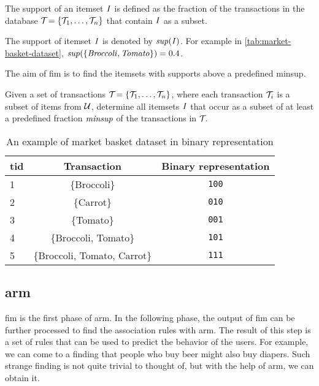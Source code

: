 \begin{definition}
    The support of an itemset $\mathit{I}$ is defined as the fraction of the transactions in the database $\mathcal{T}_{} = \{\mathcal{T}_{1}, \dots, \mathcal{T}_{n}\}{}$ that contain $\mathit{I}$ as a subset.
\end{definition}
\begin{sloppypar}
    The support of itemset $\mathit{I}$ is denoted by $\mathit{sup({I})}$.
    For example in \autoref{tab:market-basket-dataset}, $\mathit{sup({\{Broccoli, Tomato\}})} = 0.4$.
\end{sloppypar}
The aim of \acl{fim} is to find the itemsets with supports above a predefined \ac{minsup}.

\begin{definition}
    Given a set of transactions $\mathcal{T}_{} = \{\mathcal{T}_{1}, \dots, \mathcal{T}_{n}\}{}$, where each transaction $\mathcal{T}_{i}$ is a subset of items from $\mathcal{U}$, determine all itemsets $\mathit{I}$ that occur as a subset of at least a predefined fraction $\mathit{minsup}$ of the transactions in $\mathcal{T}_{}$.
\end{definition}

\begin{table}[tb]
    \centering
    \begin{tabular}{|l|c|c|}
        \hline
        \textbf{\ac{tid}} & \textbf{Transaction}         & \textbf{Binary representation} \\ \hline
        1            & \{Broccoli\}                 & \texttt{100}                   \\ \hline
        2            & \{Carrot\}                   & \texttt{010}                   \\ \hline
        3            & \{Tomato\}                   & \texttt{001}                   \\ \hline
        4            & \{Broccoli, Tomato\}         & \texttt{101}                   \\ \hline
        5            & \{Broccoli, Tomato, Carrot\} & \texttt{111}                   \\ \hline
    \end{tabular}
    \caption{An example of market basket dataset in binary representation}
    \label{tab:market-basket-dataset}
\end{table}
\subsection{\Acl{arm}}
\label{sub:association_rule_mining}
\Ac{fim} is the first phase of \ac{arm}.
In the following phase, the output of \ac{fim} can be further processed to find the association rules with \acl{arm}.
The result of this step is a set of rules that can be used to predict the behavior of the users.
For example, we can come to a finding that people who buy beer might also buy diapers.
Such strange finding is not quite trivial to thought of, but with the help of \acl{arm}, we can obtain it.


